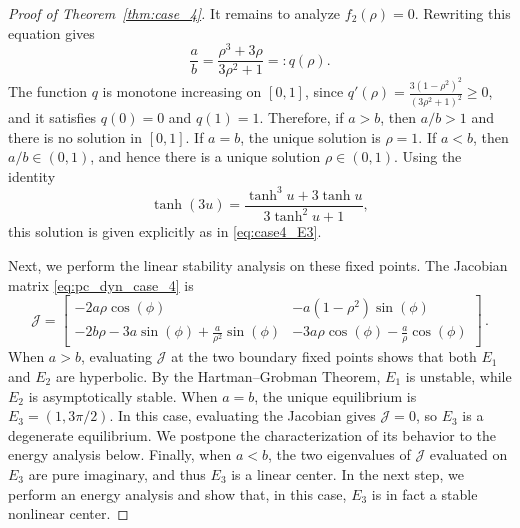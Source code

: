 \documentclass[10pt]{article}
\theoremstyle{definition}
\theoremstyle{definition}
\numberwithin{equation}{section}
\begin{document}
\begin{proof}[Proof of Theorem~\ref{thm:case_4}]
It remains to analyze $f_2(\rho)=0$. Rewriting this equation gives
\[
\frac{a}{b}
=
\frac{\rho^3+3\rho}{3\rho^2+1}
=: q(\rho).
\]
The function $q$ is monotone increasing on $[0,1]$, since $q'(\rho)
=
\frac{3(1-\rho^2)^2}{(3\rho^2+1)^2}
\geq 0$,
and it satisfies $q(0)=0$ and $q(1)=1$. Therefore, if $a>b$, then $a/b>1$ and there is no solution in $[0,1]$. 
If $a=b$, the unique solution is $\rho=1$. 
If $a<b$, then $a/b\in(0,1)$, and hence there is a unique solution $\rho\in(0,1)$.
Using the identity
\[
\tanh(3u)=\frac{\tanh^3 u+3\tanh u}{3\tanh^2 u+1},
\]
this solution is given explicitly as in \eqref{eq:case4_E3}.

Next, we perform the linear stability analysis on these fixed points. 
The Jacobian matrix \eqref{eq:pc_dyn_case_4} is
\begin{equation}
    \mathcal{J} = \begin{bmatrix}
         - 2a\rho \cos(\phi) &-a(1-\rho^2)\sin(\phi)\\
         -2b\rho - 3a\sin(\phi) + \frac{a}{\rho^2} \sin(\phi) & -3a\rho\cos(\phi) - \frac{a}{\rho}\cos(\phi) 
    \end{bmatrix} \, .
\end{equation}
When $a > b$, evaluating $\mathcal{J}$ at the two boundary fixed points shows that both $E_1$ and $E_2$ are hyperbolic.
By the Hartman--Grobman Theorem, $E_1$ is unstable, while $E_2$ is asymptotically stable.
When $a = b$, the unique equilibrium is $E_3={(1,3\pi/2)}$. 
In this case, evaluating the Jacobian gives $\mathcal{J} = 0$, so $E_3$ is a degenerate equilibrium.
We postpone the characterization of its behavior to the energy analysis below.
Finally, when $a < b$, the two eigenvalues of $\mathcal{J}$ evaluated on $E_3$ are pure imaginary, and thus $E_3$ is a linear center.
In the next step, we perform an energy analysis and show that, in this case, $E_3$ is in fact a stable nonlinear center.




\end{proof}
\end{document}
